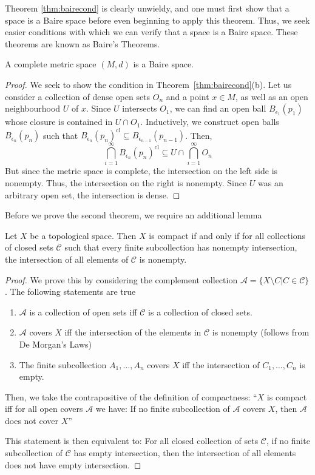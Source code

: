 \documentclass[twoside,symmetric, openany, 12pt]{./tuftebook}
\theoremstyle{definition}
\theoremstyle{definition}
\theoremstyle{definition}
\begin{document}
Theorem \ref{thm:bairecond} is clearly unwieldy, and one must first show that a space is a Baire space before even beginning to apply this theorem. Thus, we seek easier conditions with which we can verify that a space is a Baire space. These theorems are known as Baire's Theorems.
	\begin{Theorem}[Baire I]\label{thm:baire1}
		A complete metric space $(M,d)$ is a Baire space.
	\end{Theorem}
\begin{proof}
	We seek to show the condition in Theorem~\ref{thm:bairecond}(b). Let us consider a collection of dense open sets $O_n$ and a point $x\in M$, as well as an open neighbourhood $U$ of $x$. Since $U$ intersects $O_1$, we can find an open ball $B_{\epsilon_1}(p_1)$ whose closure is contained in $U \cap O_1$. Inductively, we construct open balls $B_{\epsilon_n}(p_n)$ such that $B_{\epsilon_n}(p_n)^\text{cl}\subseteq B_{\epsilon_{n-1}}(p_{n-1})$. Then, 
	\[\bigcap_{i=1}^\infty B_{\epsilon_n}(p_n)^\text{cl}\subseteq U \cap \bigcap_{i=1}^\infty O_n\]
	But since the metric space is complete, the intersection on the left side is nonempty. Thus, the intersection on the right is nonempty. Since $U$ was an arbitrary open set, the intersection is dense. 
\end{proof}
Before we prove the second theorem, we require an additional lemma
\begin{Lemma}
	Let $X$ be a topological space. Then $X$ is compact if and only if for all collections of closed sets $\mathcal{C}$ such that every finite subcollection has nonempty intersection, the intersection of all elements of $\mathcal{C}$ is nonempty.
\end{Lemma}
\begin{proof}
	We prove this by considering the complement collection $\mathcal{A} =\{X\setminus C|C\in \mathcal{C}\}$. The following statements are true
	\begin{enumerate}
		\item $\mathcal{A}$ is a collection of open sets iff $\mathcal{C}$ is a collection of closed sets.
		\item $\mathcal{A}$ covers $X$ iff the intersection of the elements in $\mathcal{C}$ is nonempty (follows from De Morgan's Laws)
		\item The finite subcollection $A_1, \dots, A_n$ covers $X$ iff the intersection of $C_1, \dots, C_n$ is empty.
	\end{enumerate}
	Then, we take the contrapositive of the definition of compactness: ``$X$ is compact iff for all open covers $\mathcal{A}$ we have: If no finite subcollection of $\mathcal{A}$ covers $X$, then $\mathcal{A}$ does not cover $X$''
	
	This statement is then equivalent to: For all closed collection of sets $\mathcal{C}$, if no finite subcollection of $\mathcal{C}$ has empty intersection, then the intersection of all elements does not have empty intersection.
\end{proof}
\end{document}

